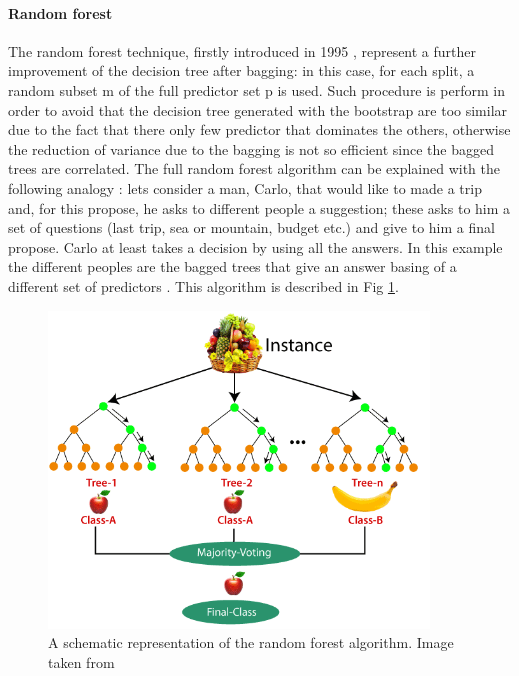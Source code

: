 \documentclass[
12pt, %
a4paper, %
oneside, %
headinclude,footinclude, %
BCOR5mm, %
]{scrartcl}
\begin{document}
\paragraph{Random forest} 
The random forest technique, firstly introduced in 1995 \cite{ho1995random}, represent a further improvement of the decision tree after bagging: in this case, for each split, a random subset m of the full predictor set p is used. Such procedure is perform in order to avoid that the decision tree generated with the bootstrap are too similar due to the fact that there only few predictor that dominates the others, otherwise the reduction of variance due to the bagging is not so efficient since the bagged trees are correlated. The full random forest algorithm can be explained with the following analogy \cite{rand_for_exp}: lets consider a man, Carlo,  that would like to made a trip and, for this propose,  he asks to different people a suggestion; these asks to him a set of questions (last trip, sea or mountain, budget etc.) and give to him a final propose. Carlo at least takes a decision by using all the answers. In this example the different peoples are the bagged trees that give an answer basing of a different set of predictors . This algorithm is described in Fig \ref{random-forest-algorithm2}.   
\begin{figure}[h]
\begin{center}
\includegraphics[width=0.9\textwidth]{Pic/random-forest-algorithm2.png}
\caption{A schematic representation of the random forest algorithm. Image taken from \cite{rand_for_fig}}
\label{random-forest-algorithm2}
\end{center}
\end{figure}
\end{document}
